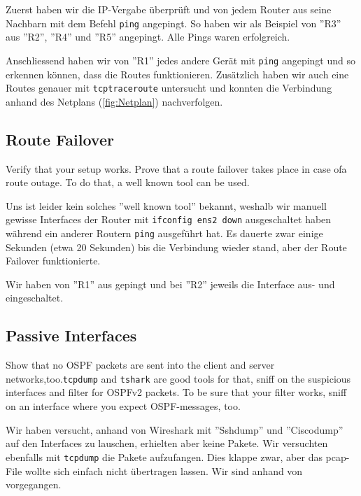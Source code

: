 \documentclass[11pt,titlepage]{article}
\newenvironment{shadedquotation}
 {\begin{shaded*}
  \quoting[leftmargin=0pt, vskip=0pt]
 }
 {\endquoting
 \end{shaded*}
}
\begin{document}
Zuerst haben wir die IP-Vergabe überprüft und von jedem Router aus seine Nachbarn mit dem Befehl \lstinline!ping! angepingt. So haben wir als Beispiel von ''R3'' aus ''R2'', ''R4'' und ''R5'' angepingt.
Alle Pings waren erfolgreich.

\medskip

Anschliessend haben wir von ''R1'' jedes andere Gerät mit \lstinline!ping! angepingt und so erkennen können, dass die Routes funktionieren. Zusätzlich haben wir auch eine Routes genauer mit \lstinline!tcptraceroute! untersucht und konnten die Verbindung anhand des Netplans (\autoref{fig:Netplan}) nachverfolgen.  

\subsection{Route Failover}
\label{subsec:RouteFailover}
\begin{shadedquotation}
  Verify that your setup works. Prove that a route failover takes place in case ofa route outage. To do that, a well known tool can be used.
\end{shadedquotation}

Uns ist leider kein solches ''well known tool'' bekannt, weshalb wir manuell gewisse Interfaces der Router mit \lstinline!ifconfig ens2 down! ausgeschaltet haben während ein anderer Routern \lstinline!ping! ausgeführt hat. Es dauerte zwar einige Sekunden (etwa 20 Sekunden) bis die Verbindung wieder stand, aber der Route Failover funktionierte.

\medskip

Wir haben von ''R1'' aus gepingt und bei ''R2'' jeweils die Interface aus- und eingeschaltet.

\subsection{Passive Interfaces}
\label{subsec:PassiveInterfaces}
\begin{shadedquotation}
  Show that no OSPF packets are sent into the client and server networks,too.\lstinline!tcpdump! and \lstinline!tshark! are good tools for that, sniff on the suspicious interfaces and filter for OSPFv2 packets. To be sure that your filter works, sniff on an interface where you expect OSPF-messages, too.
\end{shadedquotation}

Wir haben versucht, anhand von Wireshark mit ''Sshdump'' und ''Ciscodump'' auf den Interfaces zu lauschen, erhielten aber keine Pakete.
Wir versuchten ebenfalls mit \lstinline!tcpdump! die Pakete aufzufangen. Dies klappe zwar, aber das pcap-File wollte sich einfach nicht übertragen lassen. Wir sind anhand von \cite{TCPDUMP} vorgegangen.
\end{document}
